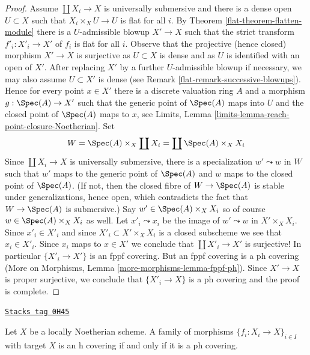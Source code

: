 \begin{proof}
\medskip\noindent
Assume $\coprod X_i \to X$ is universally submersive and
there is a dense open $U \subset X$ such that
$X_i \times_X U \to U$ is flat for all $i$.
By Theorem \ref{flat-theorem-flatten-module}
there is a $U$-admissible blowup $X' \to X$ such that
the strict transform $f'_i : X'_i \to X'$ of $f_i$ is flat for all $i$.
Observe that the projective (hence closed) morphism $X' \to X$
is surjective as $U \subset X$ is dense and as $U$ is identified
with an open of $X'$. After replacing $X'$ by a further
$U$-admissible blowup if necessary, we may also assume $U \subset X'$ is dense
(see Remark \ref{flat-remark-successive-blowups}).
Hence for every point $x \in X'$ there is a discrete valuation ring $A$
and a morphism $g : \Spec(A) \to X'$ such that the generic
point of $\Spec(A)$ maps into $U$ and the closed point of
$\Spec(A)$ maps to $x$, see Limits, Lemma
\ref{limits-lemma-reach-point-closure-Noetherian}.
Set
$$
W = \Spec(A) \times_X \coprod X_i = \coprod \Spec(A) \times_X X_i
$$
Since $\coprod X_i \to X$ is universally submersive,
there is a specialization $w' \leadsto w$ in $W$
such that $w'$ maps to the generic point of $\Spec(A)$
and $w$ maps to the closed point of $\Spec(A)$.
(If not, then the closed fibre of $W \to \Spec(A)$
is stable under generalizations, hence open, which
contradicts the fact that $W \to \Spec(A)$ is submersive.)
Say $w' \in \Spec(A) \times_X X_i$ so of course
$w \in \Spec(A) \times_X X_i$ as well. Let
$x'_i \leadsto x_i$ be the image of $w' \leadsto w$ in
$X' \times_X X_i$. Since $x'_i \in X'_i$ and since
$X'_i \subset X' \times_X X_i$ is a closed subscheme
we see that $x_i \in X'_i$. Since $x_i$ maps to $x \in X'$
we conclude that
$\coprod X'_i \to X'$ is surjective! In particular
$\{X'_i \to X'\}$ is an fppf covering. But an fppf covering is a ph covering
(More on Morphisms, Lemma \ref{more-morphisms-lemma-fppf-ph}).
Since $X' \to X$ is proper surjective, we conclude
that $\{X'_i \to X\}$ is a ph covering and the proof is complete.
\end{proof}

\begin{lemma}[Noetherian h ph]
\label{flat-lemma-Noetherian-h-ph}
\href{https://stacks.math.columbia.edu/tag/0H45}{\texttt{Stacks tag 0H45}}

Let $X$ be a locally Noetherian scheme. A family of morphisms
$\{f_i : X_i \to X\}_{i \in I}$ with target $X$ is an h covering
if and only if it is a ph covering.
\end{lemma}

